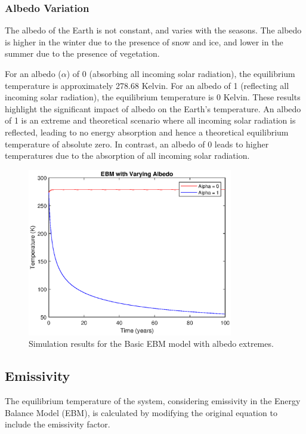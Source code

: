 \documentclass[12pt]{article}
\begin{document}
\subsubsection{Albedo Variation}
The albedo of the Earth is not constant, 
and varies with the seasons. 
The albedo is higher in the winter due to the presence of snow and ice, 
and lower in the summer due to the presence of vegetation. 

For an albedo ($\alpha$) of 0 (absorbing all incoming solar radiation), 
the equilibrium temperature is approximately 278.68 Kelvin.
For an albedo of 1 (reflecting all incoming solar radiation), 
the equilibrium temperature is 0 Kelvin.
These results highlight the significant impact of albedo on the Earth's temperature. 
An albedo of 1 is an extreme and theoretical scenario 
where all incoming solar radiation is reflected, 
leading to no energy absorption 
and hence a theoretical equilibrium temperature of absolute zero. 
In contrast, an albedo of 0 leads to higher temperatures 
due to the absorption of all incoming solar radiation. 

\begin{figure}[ht]
\centering
\includegraphics[width=0.8\textwidth]{albedo_extremes.eps}
\caption{Simulation results for the Basic EBM model with albedo extremes.}
\label{fig:albedoExtremes}
\end{figure}

\subsection{Emissivity}
The equilibrium temperature of the system, 
considering emissivity in the Energy Balance Model (EBM), 
is calculated by modifying the original equation 
to include the emissivity factor. 
\end{document}
